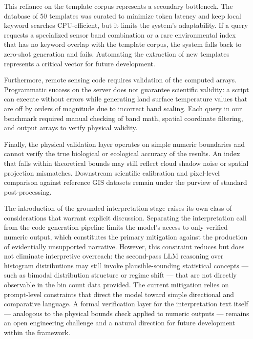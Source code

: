 \documentclass[pdflatex,sn-mathphys-ay]{sn-jnl}
\begin{document}
This reliance on the template corpus represents a secondary bottleneck. The database of 50 templates was curated to minimize token latency and keep local keyword searches CPU-efficient, but it limits the system's adaptability. If a query requests a specialized sensor band combination or a rare environmental index that has no keyword overlap with the template corpus, the system falls back to zero-shot generation and fails. Automating the extraction of new templates represents a critical vector for future development.

Furthermore, remote sensing code requires validation of the computed arrays. Programmatic success on the server does not guarantee scientific validity: a script can execute without errors while generating land surface temperature values that are off by orders of magnitude due to incorrect band scaling. Each query in our benchmark required manual checking of band math, spatial coordinate filtering, and output arrays to verify physical validity.

Finally, the physical validation layer operates on simple numeric boundaries and cannot verify the true biological or ecological accuracy of the results. An index that falls within theoretical bounds may still reflect cloud shadow noise or spatial projection mismatches. Downstream scientific calibration and pixel-level comparison against reference GIS datasets remain under the purview of standard post-processing.

The introduction of the grounded interpretation stage raises its own class of considerations that warrant explicit discussion. Separating the interpretation call from the code generation pipeline limits the model's access to only verified numeric output, which constitutes the primary mitigation against the production of evidentially unsupported narrative. However, this constraint reduces but does not eliminate interpretive overreach: the second-pass LLM reasoning over histogram distributions may still invoke plausible-sounding statistical concepts --- such as bimodal distribution structure or regime shift --- that are not directly observable in the bin count data provided. The current mitigation relies on prompt-level constraints that direct the model toward simple directional and comparative language. A formal verification layer for the interpretation text itself --- analogous to the physical bounds check applied to numeric outputs --- remains an open engineering challenge and a natural direction for future development within the framework.
\end{document}
